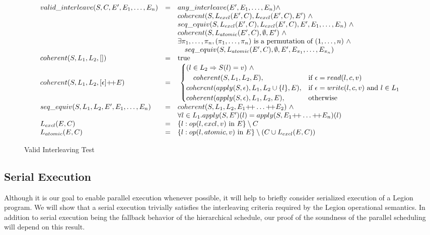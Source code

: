\begin{figure*}
$$
\begin{array}{lll}
valid\_interleave(S, C, E', {E}_1,\ldots,{E}_n) & = & any\_interleave(E', {E}_1,\ldots,{E}_n) \wedge \\
& & coherent(S, L_{excl}(E', C), L_{excl}(E', C), E')\ \wedge \\
& & seq\_equiv(S, L_{excl}(E', C), L_{excl}(E', C), E', {E}_1,\ldots,{E}_n)\ \wedge \\
& & coherent(S, L_{atomic}(E', C), \emptyset, E')\ \wedge \\
& & \exists {\pi}_1,\ldots,{\pi}_n, ({\pi}_1,\ldots,{\pi}_n) \text{ is a permutation of } (1,\ldots,n)\ \wedge \\
& & \ \ \ seq\_equiv(S, L_{atomic}(E', C), \emptyset, E', E_{\pi_1}, \ldots, E_{\pi_n}) \\
coherent(S, L_1, L_2, []) & = & \text{true} \\
coherent(S, L_1, L_2, [ \epsilon ] \text{+\!+} E) & = &\
\begin{cases}
(l \in L_2 \Rightarrow S(l) = v)\ \wedge \\
\ \ \ coherent(S, L_1, L_2, E), & \text{if $\epsilon = read(l, c, v)$} \\
coherent(apply(S, \epsilon), L_1, L_2 \cup \{ l \}, E), & \text{if $\epsilon = write(l, c, v)$ and $l \in L_1$} \\
coherent(apply(S, \epsilon), L_1, L_2, E), & \text{otherwise}
\end{cases} \\
seq\_equiv(S, L_1, L_2, E', {E}_1,\ldots,{E}_n) & = & coherent(S, L_1, L_2, E_1 \text{+\!+} \ldots \text{+\!+} E_2)\ \wedge \\
& & \forall l \in L_1. apply(S, E')(l) = apply(S, E_1 \text{+\!+} \ldots \text{+\!+} E_n)(l) \\
L_{excl}(E, C) & = & \{ l : op(l, excl, v) \text{ in } E  \} \setminus C \\
L_{atomic}(E, C) & = & \{ l : op(l, atomic, v) \text{ in } E \} \setminus (C \cup L_{excl}(E, C)) \\
\end{array}
$$
\caption{Valid Interleaving Test}
\label{fig:validinterleave}
\vspace{-5mm}
\end{figure*}

\subsection{Serial Execution}
\label{subsec:coherenceserial}

Although it is our goal to enable parallel execution whenever possible, it will help to briefly
consider serialized execution of a Legion program.  We will show that a serial execution trivially
satisfies the interleaving criteria required by the Legion operational semantics.  In addition to
serial execution being the fallback behavior of the hierarchical schedule, our proof of the
soundness of the parallel scheduling will depend on this result.

